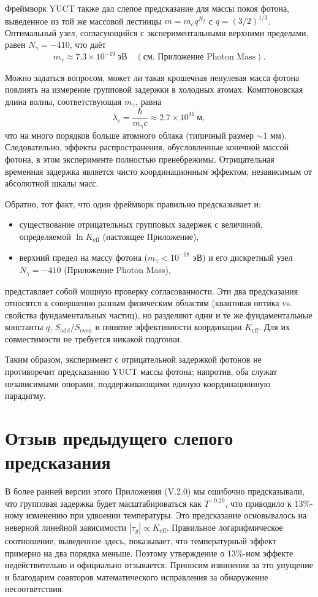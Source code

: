 \documentclass[12pt,a4paper]{article}
\newcommand{\Keff}{K_{\mathrm{eff}}}
\begin{document}
	Фреймворк YUCT также дал слепое предсказание для массы покоя фотона, выведенное из той же массовой лестницы \(m = m_e q^{N_f}\) с \(q=(3/2)^{1/3}\). Оптимальный узел, согласующийся с экспериментальными верхними пределами, равен \(N_\gamma = -410\), что даёт
	\[
	m_\gamma \approx 7.3 \times 10^{-19}~\text{эВ} \quad (\text{см. Приложение Photon Mass}).
	\]
	
	Можно задаться вопросом, может ли такая крошечная ненулевая масса фотона повлиять на измерение групповой задержки в холодных атомах. Комптоновская длина волны, соответствующая \(m_\gamma\), равна
	\[
	\lambda_c = \frac{\hbar}{m_\gamma c} \approx 2.7\times10^{11}~\text{м},
	\]
	что на много порядков больше атомного облака (типичный размер \(\sim 1\) мм). Следовательно, эффекты распространения, обусловленные конечной массой фотона, в этом эксперименте полностью пренебрежимы. Отрицательная временная задержка является чисто координационным эффектом, независимым от абсолютной шкалы масс.
	
	Обратно, тот факт, что один фреймворк правильно предсказывает и:
	\begin{itemize}
		\item существование отрицательных групповых задержек с величиной, определяемой \(\ln\Keff\) (настоящее Приложение),
		\item верхний предел на массу фотона (\(m_\gamma < 10^{-18}\) эВ) и его дискретный узел \(N_\gamma = -410\) (Приложение Photon Mass),
	\end{itemize}
	представляет собой мощную проверку согласованности. Эти два предсказания относятся к совершенно разным физическим областям (квантовая оптика vs. свойства фундаментальных частиц), но разделяют одни и те же фундаментальные константы \(q\), \(S_{\mathrm{odd}}/S_{\mathrm{even}}\) и понятие эффективности координации \(\Keff\). Для их совместимости не требуется никакой подгонки.
	
	Таким образом, эксперимент с отрицательной задержкой фотонов не противоречит предсказанию YUCT массы фотона; напротив, оба служат независимыми опорами, поддерживающими единую координационную парадигму.
	
	\section{Отзыв предыдущего слепого предсказания}
	
	В более ранней версии этого Приложения (V.2.0) мы ошибочно предсказывали, что групповая задержка будет масштабироваться как \(T^{-0.20}\), что приводило к 13\%-ному изменению при удвоении температуры. Это предсказание основывалось на неверной линейной зависимости \(|\tau_g| \propto \Keff\). Правильное логарифмическое соотношение, выведенное здесь, показывает, что температурный эффект примерно на два порядка меньше. Поэтому утверждение о 13\%-ном эффекте недействительно и официально отзывается. Приносим извинения за это упущение и благодарим соавторов математического исправления за обнаружение несоответствия.
	
\end{document}
